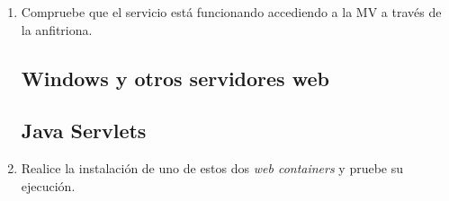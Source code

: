\documentclass[paper=a4, fontsize=11pt]{scrartcl} %
\numberwithin{equation}{section} %
\numberwithin{figure}{section} %
\numberwithin{table}{section} %
\begin{document}
\begin{enumerate}
\begin{itemize}
			\item Al igual que WildFly, GlassFish es un servidor de aplicaciones implementado en Java
			en código abierto y desarrollado por \textit{Oracle Corporation} bajo una licencia dual
			\href{https://opensource.org/licenses/CDDL-1.0}{\textbf{Common Development and Distribution
			License (CDDL)}}\footnote{En este enlace, no he usado el oficial, es decir, el de Oracle
			porque me dio la sensación de que dirigía a un archivo temporal pero lo dejo aquí:
			\href{http://www.oracle.com/technetwork/middleware/oedq/help/edq11help-2152391.pdf}{\textbf{CDDL}}}
			\& \href{https://www.gnu.org/licenses/gpl.html}{\textbf{GPL}}
			con una ligera modificación.\cite{GF_official}\cite{GF_install}
		\end{itemize}
		
	\subsection{Windows: IIS}
		\item Compruebe que el servicio está funcionando accediendo a la MV a través de la anfitriona.
	\subsection{Windows y otros servidores web}
	\subsection{Java Servlets}
		\item Realice la instalación de uno de estos dos \textit{web containers} y pruebe su ejecución.
	

\end{enumerate}
\end{document}
